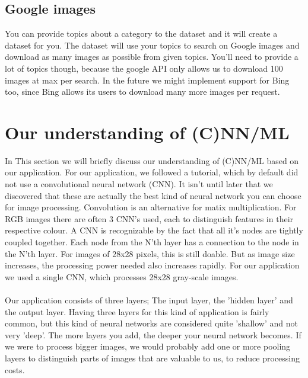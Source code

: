 \documentclass[fleqn,10pt]{SelfArx} %
\begin{document}
\subsection{Google images}
You can provide topics about a category to the dataset and it will create a dataset for you. The dataset will use your topics to search on Google images and download as many images as possible from given topics. You'll need to provide a lot of topics though, because the google API only allows us to download 100 images at max per search. In the future we might implement support for Bing too, since Bing allows its users to download many more images per request.


\section{Our understanding of (C)NN/ML}
In This section we will briefly discuss our understanding of (C)NN/ML based on our application.
For our application, we followed a tutorial, which by default did not use a convolutional neural network (CNN). It isn't until later that we discovered that these are actually the best kind of neural network you can choose for image processing. Convolution is an alternative for matix multiplication. For RGB images there are often 3 CNN's used, each to distinguish features in their respective colour. A CNN is recognizable by the fact that all it's nodes are tightly coupled together. Each node from the N'th layer has a connection to the node in the N'th layer.
For images of 28x28 pixels, this is still doable. But as image size increases, the processing power needed also increases rapidly. For our application we used a single CNN, which processes 28x28 gray-scale images.\\ \\
Our application consists of three layers; The input layer, the 'hidden layer' and the output layer. Having three layers for this kind of application is fairly common, but this kind of neural networks are considered quite 'shallow' and not very 'deep'. The more layers you add, the deeper your neural network becomes. If we were to process bigger images, we would probably add one or more pooling layers to distinguish parts of images that are valuable to us, to reduce processing costs.\\ \\
\end{document}
